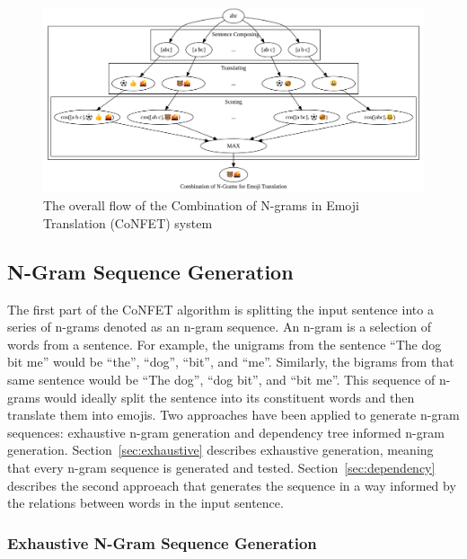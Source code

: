\documentclass{article}[10]
\begin{document}
\begin{figure}[h]
  \begin{center}
    \includegraphics[width=1.0\textwidth]{figures/flow.png}
    \caption{The overall flow of the Combination of N-grams in Emoji Translation
      (CoNFET) system\label{fig:flow}}
  \end{center}
\end{figure}

\subsection{N-Gram Sequence Generation\label{sec:N-gramSequenceGeneration}}

The first part of the CoNFET algorithm is splitting the input sentence into a series of n-grams denoted as an n-gram sequence. An n-gram is a selection of words from a sentence. For example, the unigrams from the sentence ``The dog bit me'' would be ``the'', ``dog'', ``bit'', and ``me''. Similarly, the bigrams from that same sentence would be ``The dog'', ``dog bit'', and ``bit me''. This sequence of n-grams would ideally split the sentence into its constituent words and then translate them into emojis. Two approaches have been applied to generate n-gram sequences: exhaustive n-gram generation and dependency tree informed n-gram generation. Section~\ref{sec:exhaustive} describes exhaustive generation, meaning that every n-gram sequence is generated and tested. Section~\ref{sec:dependency} describes the second approeach that generates the sequence in a way informed by the relations between words in the input sentence.

\subsubsection{Exhaustive N-Gram Sequence Generation\label{sec:exhaustive}}
\end{document}
